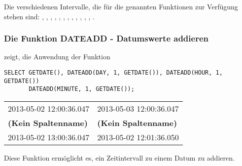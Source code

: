         \begin{merke}
          Die verschiedenen Intervalle, die für die genannten Funktionen zur
          Verfügung stehen sind: ,
          ,  ,
          , , ,
          , , ,
          , , ,
          .
        \end{merke}
        \subsubsection{Die Funktion DATEADD - Datumswerte addieren}
           zeigt, die Anwendung der Funktion 
          \begin{lstlisting}[language=ms_sql,caption={Die Funktion \languagemssql{DATEADD} in SQL Server},label=sql03_22]
SELECT GETDATE(), DATEADD(DAY, 1, GETDATE()), DATEADD(HOUR, 1, GETDATE())
       DATEADD(MINUTE, 1, GETDATE());
          \end{lstlisting}
          \begin{center}
            \begin{small}
              \tabletail{}
              \tablelasttail{}
              \begin{mssql}
                \begin{supertabular}{ll}
                  2013-05-02 12:00:36.047 & 2013-05-03 12:00:36.047 \\
                  \textbf{(Kein Spaltenname)} & \textbf{(Kein Spaltenname)} \\
                  \cmidrule(l){1-1}\cmidrule(l){2-2}
                  2013-05-02 13:00:36.047 & 2013-05-02 12:01:36.050 \\
                \end{supertabular}
              \end{mssql}
            \end{small}
          \end{center}
          Diese Funktion ermöglicht es, ein Zeitintervall zu einem Datum zu addieren.
